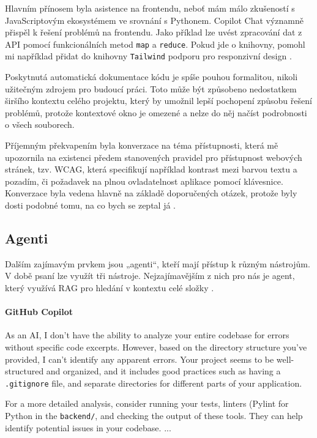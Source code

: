 \documentclass[FM,DP]{tulthesis}
\begin{document}
		Hlavním přínosem byla asistence na frontendu, neboť mám málo zkušeností s JavaScriptovým ekosystémem ve srovnání s Pythonem. Copilot Chat významně přispěl k řešení problémů na frontendu. Jako příklad lze uvést zpracování dat z API pomocí funkcionálních metod \verb|map| a \verb|reduce|. Pokud jde o knihovny, pomohl mi například přidat do knihovny \verb|Tailwind| podporu pro responzivní design \cite{map_reduce} \cite{tailwind}.
		
		Poskytnutá automatická dokumentace kódu je spíše pouhou formalitou, nikoli užitečným zdrojem pro budoucí práci. Toto může být způsobeno nedostatkem širšího kontextu celého projektu, který by umožnil lepší pochopení způsobu řešení problémů, protože kontextové okno je omezené a nelze do něj načíst podrobnosti o všech souborech.
		
		Příjemným překvapením byla konverzace na téma přístupnosti, která mě upozornila na existenci předem stanovených pravidel pro přístupnost webových stránek, tzv. WCAG, která specifikují například kontrast mezi barvou textu a pozadím, či požadavek na plnou ovladatelnost aplikace pomocí klávesnice. Konverzace byla vedena hlavně na základě doporučených otázek, protože byly dosti podobné tomu, na co bych se zeptal já \cite{aria}.
		
		\subsection{Agenti}
		
		Dalším zajímavým prvkem jsou „agenti“, kteří mají přístup k různým nástrojům. V době psaní lze využít tři nástroje. Nejzajímavějším z nich pro nás je agent, který využívá RAG pro hledání v kontextu celé složky \cite{gh_agents}.
		
		\vspace{0.6em}
		\begin{tcolorbox}[colback=white,colframe=black]
			\paragraph{GitHub Copilot}
			As an AI, I don't have the ability to analyze your entire codebase for errors without specific code excerpts. However, based on the directory structure you've provided, I can't identify any apparent errors. Your project seems to be well-structured and organized, and it includes good practices such as having a \verb|.gitignore| file, and separate directories for different parts of your application.
			
			For a more detailed analysis, consider running your tests, linters (Pylint for Python in the \verb|backend/|, and checking the output of these tools. They can help identify potential issues in your codebase. 
			... \cite{codebase_analysis}
		\end{tcolorbox}
		
\end{document}
